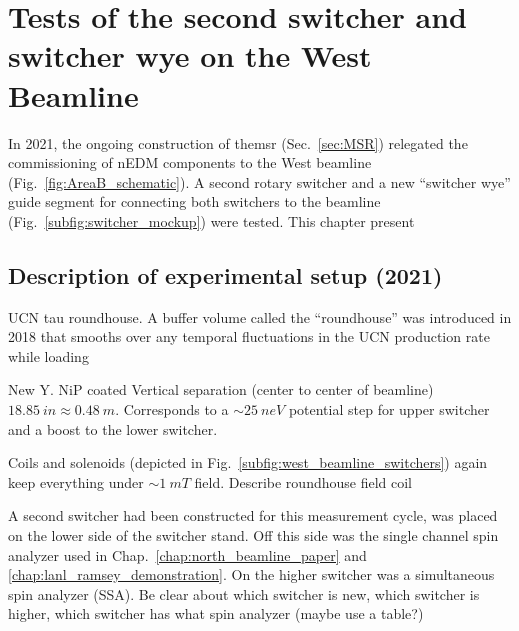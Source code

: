 
\chapter{Tests of the second switcher and switcher wye on the West Beamline}\label{chap:fall2021}


In 2021, the ongoing construction of the\acrshort{msr} (Sec.~\ref{sec:MSR}) relegated the commissioning of nEDM components to the West beamline (Fig.~\ref{fig:AreaB_schematic}). A second rotary switcher and a new ``switcher wye'' guide segment for connecting both switchers to the beamline (Fig.~\ref{subfig:switcher_mockup}) were tested. This chapter present


\section{Description of experimental setup (2021)}


UCN tau roundhouse. A buffer volume called the ``roundhouse'' was introduced in 2018 that  smooths over any temporal fluctuations in the UCN production rate while loading

New Y. NiP coated Vertical separation (center to center of beamline) $\qty{18.85}{in}\approx\qty{0.48}{m}$. Corresponds to a $\sim \qty{25}{neV}$ potential step for upper switcher and a boost to the lower switcher. 

Coils and solenoids (depicted in Fig.~\ref{subfig:west_beamline_switchers}) again keep everything under $\sim \qty{1}{mT}$ field. Describe roundhouse field coil

A second switcher had been constructed for this measurement cycle, was placed on the lower side of the switcher stand. Off this side was the single channel spin analyzer used in Chap.~\ref{chap:north_beamline_paper} and \ref{chap:lanl_ramsey_demonstration}. On the higher switcher was a simultaneous spin analyzer (SSA). Be clear about which switcher is new, which switcher is higher, which switcher has what spin analyzer (maybe use a table?)

